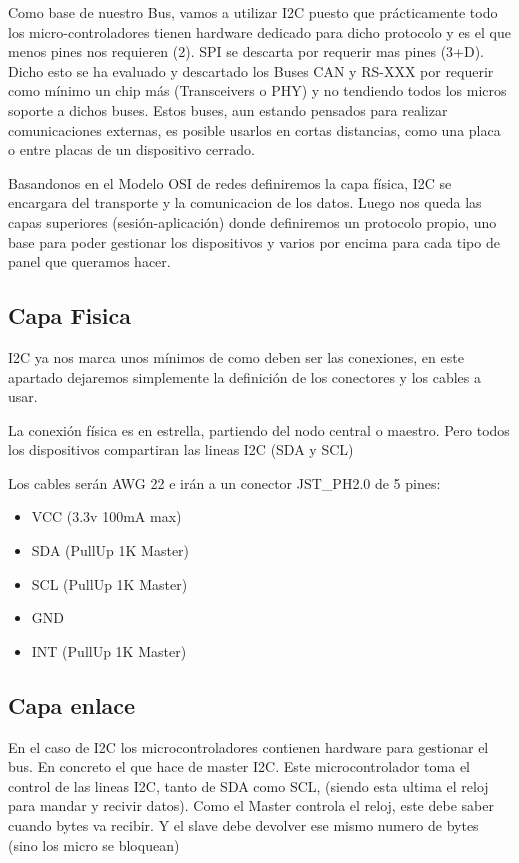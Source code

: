 Como base de nuestro Bus, vamos a utilizar I2C puesto que prácticamente todo los micro-controladores tienen
hardware dedicado para dicho protocolo y es el que menos pines nos requieren (2). SPI se descarta por requerir
mas pines (3+D). Dicho esto se ha evaluado y descartado los Buses CAN y RS-XXX por requerir como mínimo un chip
más (Transceivers o PHY) y no tendiendo todos los micros soporte a dichos buses. Estos buses, aun estando
pensados para realizar comunicaciones externas, es posible usarlos en cortas distancias, como una placa o entre
placas de un dispositivo cerrado.

Basandonos en el Modelo OSI de redes definiremos la capa física, I2C se encargara del transporte y la
comunicacion de los datos. Luego nos queda las capas superiores (sesión-aplicación) donde definiremos un
protocolo propio, uno base para poder gestionar los dispositivos y varios por encima para cada tipo de panel
que queramos hacer.

\subsection{Capa Fisica}
I2C ya nos marca unos mínimos de como deben ser las conexiones, en este apartado dejaremos simplemente la
definición de los conectores y los cables a usar.

La conexión física es en estrella, partiendo del nodo central o maestro. Pero todos los dispositivos compartiran
las lineas I2C (SDA y SCL)

Los cables serán AWG 22 e irán a un conector JST\_PH2.0 de 5 pines:

\begin{itemize}
    \item VCC (3.3v 100mA max)
    \item SDA (PullUp 1K Master)
    \item SCL (PullUp 1K Master)
    \item GND
    \item INT (PullUp 1K Master)
\end{itemize}


\subsection{Capa enlace}
En el caso de I2C los microcontroladores contienen hardware para gestionar el bus. En concreto el que hace de
master I2C. Este microcontrolador toma el control de las lineas I2C, tanto de SDA como SCL, (siendo esta ultima
el reloj para mandar y recivir datos). Como el Master controla el reloj, este debe saber cuando bytes va recibir.
Y el slave debe devolver ese mismo numero de bytes (sino los micro se bloquean)

